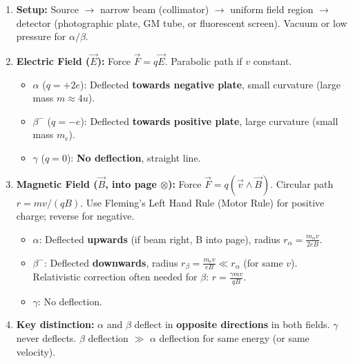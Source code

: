 \documentclass[11pt]{article}
\begin{document}
\begin{methode}
\begin{enumerate}
\item \textbf{Setup:} Source $\to$ narrow beam (collimator) $\to$ uniform field region $\to$ detector (photographic plate, GM tube, or fluorescent screen). Vacuum or low pressure for $\alpha/\beta$.
\item \textbf{Electric Field ($\vec{E}$):} Force $\vec{F} = q\vec{E}$. Parabolic path if $v$ constant.
\begin{itemize}
\item $\alpha$ ($q=+2e$): Deflected \textbf{towards negative plate}, small curvature (large mass $m \approx 4u$).
\item $\beta^-$ ($q=-e$): Deflected \textbf{towards positive plate}, large curvature (small mass $m_e$).
\item $\gamma$ ($q=0$): \textbf{No deflection}, straight line.
\end{itemize}
\item \textbf{Magnetic Field ($\vec{B}$, into page $\otimes$):} Force $\vec{F} = q(\vec{v} \wedge \vec{B})$. Circular path $r = mv/(qB)$. Use Fleming's Left Hand Rule (Motor Rule) for positive charge; reverse for negative.
\begin{itemize}
\item $\alpha$: Deflected \textbf{upwards} (if beam right, B into page), radius $r_\alpha = \frac{m_\alpha v}{2eB}$.
\item $\beta^-$: Deflected \textbf{downwards}, radius $r_\beta = \frac{m_e v}{eB} \ll r_\alpha$ (for same $v$). Relativistic correction often needed for $\beta$: $r = \frac{\gamma m v}{qB}$.
\item $\gamma$: No deflection.
\end{itemize}
\item \textbf{Key distinction:} $\alpha$ and $\beta$ deflect in \textbf{opposite directions} in both fields. $\gamma$ never deflects. $\beta$ deflection $\gg$ $\alpha$ deflection for same energy (or same velocity).
\end{enumerate}
\end{methode}
\end{document}
